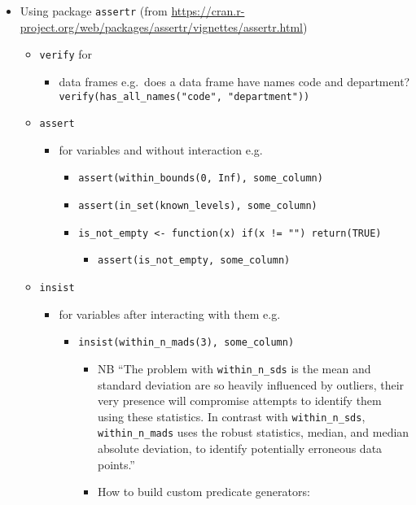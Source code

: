 \documentclass[
  letterpaper,
  DIV=11,
  numbers=noendperiod,
  oneside]{scrreprt}
\providecommand{\tightlist}{%
  \setlength{\itemsep}{0pt}\setlength{\parskip}{0pt}}\usepackage{longtable,booktabs,array}
\begin{document}
\begin{itemize}
\item
  Using package \texttt{assertr} (from
  \url{https://cran.r-project.org/web/packages/assertr/vignettes/assertr.html})

  \begin{itemize}
  \item
    \texttt{verify} for

    \begin{itemize}
    \tightlist
    \item
      data frames e.g.~does a data frame have names code and department?
      \texttt{verify(has\_all\_names("code",\ "department"))}
    \end{itemize}
  \item
    \texttt{assert}

    \begin{itemize}
    \item
      for variables and without interaction e.g.

      \begin{itemize}
      \item
        \texttt{assert(within\_bounds(0,\ Inf),\ some\_column)}
      \item
        \texttt{assert(in\_set(known\_levels),\ some\_column)}
      \item
        \texttt{is\_not\_empty\ \textless{}-\ function(x)\ if(x\ !=\ "")\ return(TRUE)}

        \begin{itemize}
        \tightlist
        \item
          \texttt{assert(is\_not\_empty,\ some\_column)}
        \end{itemize}
      \end{itemize}
    \end{itemize}
  \item
    \texttt{insist}

    \begin{itemize}
    \item
      for variables after interacting with them e.g.

      \begin{itemize}
      \item
        \texttt{insist(within\_n\_mads(3),\ some\_column)}

        \begin{itemize}
        \item
          NB ``The problem with \texttt{within\_n\_sds} is the mean and
          standard deviation are so heavily influenced by outliers,
          their very presence will compromise attempts to identify them
          using these statistics. In contrast with
          \texttt{within\_n\_sds}, \texttt{within\_n\_mads} uses the
          robust statistics, median, and median absolute deviation, to
          identify potentially erroneous data points.''
        \item
          How to build custom predicate generators:


\end{itemize}
\end{itemize}
\end{itemize}
\end{itemize}
\end{itemize}
\end{document}
